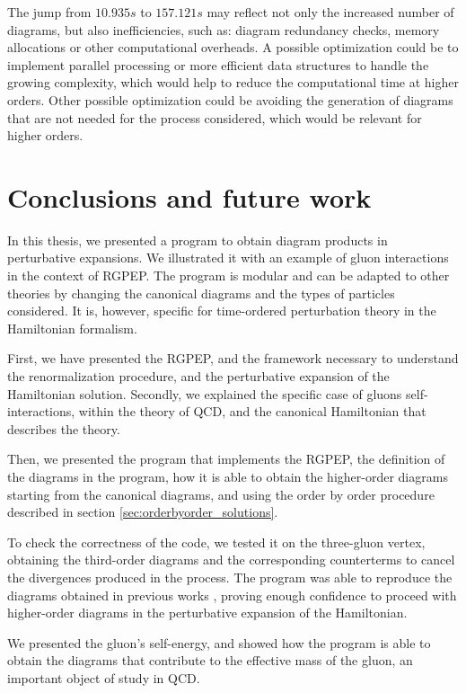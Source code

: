 \documentclass[11pt,a4paper,twoside,pdf]{article}
\numberwithin{equation}{section}
\begin{document}
The jump from $10.935 s$ to $157.121 s$ may reflect not only the increased number of diagrams, 
but also inefficiencies, such as: diagram redundancy checks, memory allocations or 
other computational overheads. A possible optimization could be to implement 
parallel processing or more efficient data structures to handle the growing complexity, 
which would help to reduce the computational time at higher orders. Other possible
optimization could be avoiding the generation of diagrams that are not needed for the 
process considered, which would be relevant for higher orders.

\newpage

\section{Conclusions and future work} \label{sec:conclusions}

In this thesis, we presented a program to obtain diagram products in
perturbative expansions. We illustrated it with an example of gluon interactions in 
the context of RGPEP.
The program is modular and can be adapted to other theories by changing the
canonical diagrams and the types of particles considered. It is, however, specific for
time-ordered perturbation theory in the Hamiltonian formalism.

First, we have presented the RGPEP, and the framework necessary to understand the 
renormalization procedure, and the perturbative expansion of the Hamiltonian solution. 
Secondly, we explained the specific case of gluons self-interactions, within the
theory of QCD, and the canonical Hamiltonian that describes the theory.

Then, we presented the program that implements the RGPEP, the definition of the diagrams 
in the program, how it is able to obtain the higher-order diagrams starting
from the canonical diagrams, and using the order by order procedure described in section
\ref{sec:orderbyorder_solutions}. 

To check the correctness of the code, we tested it on the three-gluon vertex,
obtaining the third-order diagrams and the corresponding counterterms to cancel
the divergences produced in the process. The program was able to reproduce the
diagrams obtained in previous works \cite{QCDG}, proving enough confidence to proceed with higher-order diagrams
in the perturbative expansion of the Hamiltonian.

We presented the gluon's self-energy, and showed how the program is able to
obtain the diagrams that contribute to the effective mass
of the gluon, an important object of study in QCD.
\end{document}
